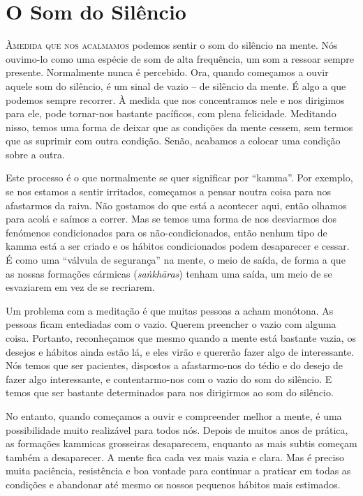 \chapter{O Som do Silêncio}

\lettrine{À}{\space medida que nos acalmamos} podemos sentir o som do silêncio na mente. Nós
ouvimo-lo como uma espécie de som de alta frequência, um som a ressoar sempre
presente. Normalmente nunca é percebido. Ora, quando começamos a ouvir aquele
som do silêncio, é um sinal de vazio -- de silêncio da mente. É algo a que
podemos sempre recorrer. À medida que nos concentramos nele e nos dirigimos para
ele, pode tornar-nos bastante pacíficos, com plena felicidade. Meditando nisso,
temos uma forma de deixar que as condições da mente cessem, sem termos que as
suprimir com outra condição. Senão, acabamos a colocar uma condição sobre a
outra.

Este processo é o que normalmente se quer significar por ``kamma''. Por exemplo,
se nos estamos a sentir irritados, começamos a pensar noutra coisa para nos
afastarmos da raiva. Não gostamos do que está a acontecer aqui, então olhamos
para acolá e saímos a correr. Mas se temos uma forma de nos desviarmos dos
fenómenos condicionados para os não-condicionados, então nenhum tipo de kamma
está a ser criado e os hábitos condicionados podem desaparecer e cessar. É como
uma ``válvula de segurança'' na mente, o meio de saída, de forma a que as nossas
formações cármicas (\emph{saṅkhāras}) tenham uma saída, um meio de se esvaziarem
em vez de se recriarem.

Um problema com a meditação é que muitas pessoas a acham monótona. As pessoas
ficam entediadas com o vazio. Querem preencher o vazio com alguma coisa.
Portanto, reconheçamos que mesmo quando a mente está bastante vazia, os desejos
e hábitos ainda estão lá, e eles virão e quererão fazer algo de interessante.
Nós temos que ser pacientes, dispostos a afastarmo-nos do tédio e do desejo de
fazer algo interessante, e contentarmo-nos com o vazio do som do silêncio. E
temos que ser bastante determinados para nos dirigirmos ao som do silêncio.

No entanto, quando começamos a ouvir e compreender melhor a mente, é uma
possibilidade muito realizável para todos nós. Depois de muitos anos de prática,
as formações kammicas grosseiras desaparecem, enquanto as mais subtis começam
também a desaparecer. A mente fica cada vez mais vazia e clara. Mas é preciso
muita paciência, resistência e boa vontade para continuar a praticar em todas as
condições e abandonar até mesmo os nossos pequenos hábitos mais estimados.

